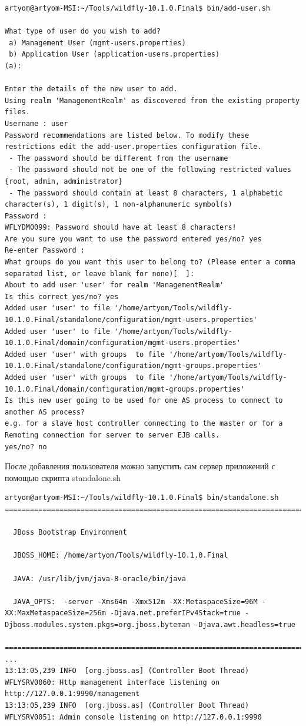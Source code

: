 \begin{lstlisting}
artyom@artyom-MSI:~/Tools/wildfly-10.1.0.Final$ bin/add-user.sh 

What type of user do you wish to add? 
 a) Management User (mgmt-users.properties) 
 b) Application User (application-users.properties)
(a): 

Enter the details of the new user to add.
Using realm 'ManagementRealm' as discovered from the existing property files.
Username : user
Password recommendations are listed below. To modify these restrictions edit the add-user.properties configuration file.
 - The password should be different from the username
 - The password should not be one of the following restricted values {root, admin, administrator}
 - The password should contain at least 8 characters, 1 alphabetic character(s), 1 digit(s), 1 non-alphanumeric symbol(s)
Password : 
WFLYDM0099: Password should have at least 8 characters!
Are you sure you want to use the password entered yes/no? yes
Re-enter Password : 
What groups do you want this user to belong to? (Please enter a comma separated list, or leave blank for none)[  ]: 
About to add user 'user' for realm 'ManagementRealm'
Is this correct yes/no? yes
Added user 'user' to file '/home/artyom/Tools/wildfly-10.1.0.Final/standalone/configuration/mgmt-users.properties'
Added user 'user' to file '/home/artyom/Tools/wildfly-10.1.0.Final/domain/configuration/mgmt-users.properties'
Added user 'user' with groups  to file '/home/artyom/Tools/wildfly-10.1.0.Final/standalone/configuration/mgmt-groups.properties'
Added user 'user' with groups  to file '/home/artyom/Tools/wildfly-10.1.0.Final/domain/configuration/mgmt-groups.properties'
Is this new user going to be used for one AS process to connect to another AS process? 
e.g. for a slave host controller connecting to the master or for a Remoting connection for server to server EJB calls.
yes/no? no
\end{lstlisting}

После добавления пользователя можно запустить сам сервер приложений с помощью скрипта standalone.sh

\begin{lstlisting}
artyom@artyom-MSI:~/Tools/wildfly-10.1.0.Final$ bin/standalone.sh
=========================================================================

  JBoss Bootstrap Environment

  JBOSS_HOME: /home/artyom/Tools/wildfly-10.1.0.Final

  JAVA: /usr/lib/jvm/java-8-oracle/bin/java

  JAVA_OPTS:  -server -Xms64m -Xmx512m -XX:MetaspaceSize=96M -XX:MaxMetaspaceSize=256m -Djava.net.preferIPv4Stack=true -Djboss.modules.system.pkgs=org.jboss.byteman -Djava.awt.headless=true

=========================================================================
...
13:13:05,239 INFO  [org.jboss.as] (Controller Boot Thread) WFLYSRV0060: Http management interface listening on http://127.0.0.1:9990/management
13:13:05,239 INFO  [org.jboss.as] (Controller Boot Thread) WFLYSRV0051: Admin console listening on http://127.0.0.1:9990
\end{lstlisting}

